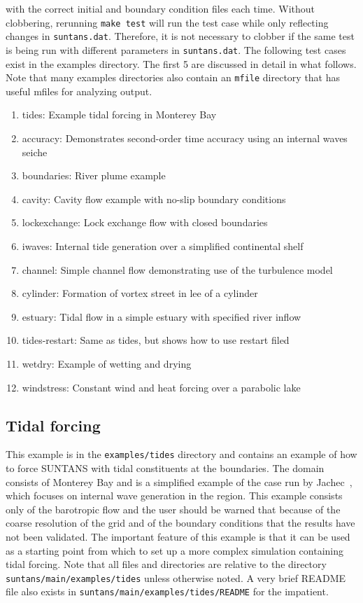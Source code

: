 with the correct initial and boundary condition files each time.  Without clobbering,
rerunning \verb+make test+ will run the test case while only reflecting changes in \verb+suntans.dat+.
Therefore, it is not necessary to clobber if the same test is being run with different 
parameters in \verb+suntans.dat+.  The following test cases exist in the examples
directory.  The first 5 are discussed in detail in what follows.  Note that many examples
directories also contain an \verb+mfile+ directory that has useful mfiles for analyzing output.
\begin{enumerate}
\item tides: Example tidal forcing in Monterey Bay
\item accuracy: Demonstrates second-order time accuracy using an internal waves seiche
\item boundaries: River plume example
\item cavity: Cavity flow example with no-slip boundary conditions
\item lockexchange: Lock exchange flow with closed boundaries
\item iwaves: Internal tide generation over a simplified continental shelf
\item channel: Simple channel flow demonstrating use of the turbulence model
\item cylinder: Formation of vortex street in lee of a cylinder
\item estuary: Tidal flow in a simple estuary with specified river inflow
\item tides-restart: Same as tides, but shows how to use restart filed
\item wetdry: Example of wetting and drying
\item windstress: Constant wind and heat forcing over a parabolic lake
\end{enumerate}

\subsection{Tidal forcing} \label{sec:tidalforcing}

This example is in the \verb+examples/tides+ directory and contains an example of how
to force SUNTANS with tidal constituents at the boundaries.  The domain consists of
Monterey Bay and is a simplified example of the case run by Jachec\etal~\cite{JACHEC[2006]},
which focuses on internal wave generation in the region.  This example consists only of the
barotropic flow and the user should be warned that because of the coarse resolution of the
grid and of the boundary conditions that the results have not been validated.  The important feature of
this example is that it can be used as a starting point from which to set up a more
complex simulation containing tidal forcing.  Note that all files and directories are relative
to the directory \verb+suntans/main/examples/tides+ unless otherwise noted.  A very brief
README file also exists in \verb+suntans/main/examples/tides/README+ for the impatient.

